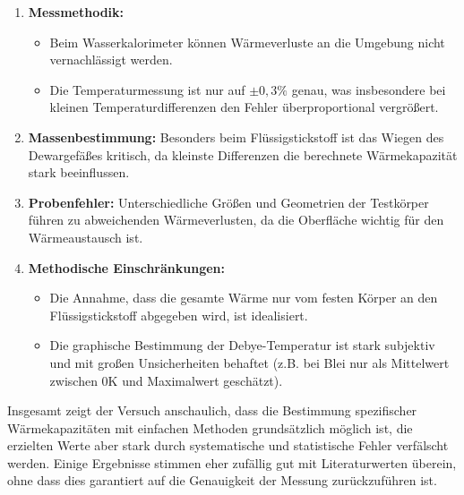 \begin{enumerate}
    \item \textbf{Messmethodik:} 
    \begin{itemize}
        \item Beim Wasserkalorimeter können Wärmeverluste an die Umgebung nicht vernachlässigt werden.  
        \item Die Temperaturmessung ist nur auf \(\pm 0{,}3\%\) genau, was insbesondere bei kleinen Temperaturdifferenzen den Fehler überproportional vergrößert.  
    \end{itemize}
    
    \item \textbf{Massenbestimmung:}  
    Besonders beim Flüssigstickstoff ist das Wiegen des Dewargefäßes kritisch, da kleinste Differenzen die berechnete Wärmekapazität stark beeinflussen.  

    \item \textbf{Probenfehler:}  
    Unterschiedliche Größen und Geometrien der Testkörper führen zu abweichenden Wärmeverlusten, da die Oberfläche wichtig für den Wärmeaustausch ist.
    
    \item \textbf{Methodische Einschränkungen:}  
    \begin{itemize}
        \item Die Annahme, dass die gesamte Wärme nur vom festen Körper an den Flüssigstickstoff abgegeben wird, ist idealisiert.  
        \item Die graphische Bestimmung der Debye-Temperatur ist stark subjektiv und mit großen Unsicherheiten behaftet (z.B. bei Blei nur als Mittelwert zwischen 0K und Maximalwert geschätzt).  
    \end{itemize}
\end{enumerate}

Insgesamt zeigt der Versuch anschaulich, dass die Bestimmung spezifischer Wärmekapazitäten mit einfachen Methoden grundsätzlich möglich ist, die erzielten Werte aber stark durch systematische und statistische Fehler verfälscht werden. Einige Ergebnisse stimmen eher zufällig gut mit Literaturwerten überein, ohne dass dies garantiert auf die Genauigkeit der Messung zurückzuführen ist.
